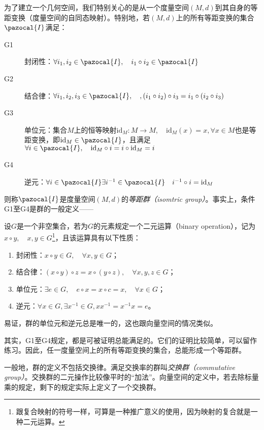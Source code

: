 \documentclass[../main.tex]{subfiles}
\begin{document}
为了建立一个几何空间，我们特别关心的是从一个度量空间$\left(M,d\right)$到其自身的等距变换（度量空间的自同态映射）。特别地，若$\left(M,d\right)$上的所有等距变换的集合$\pazocal{I}$满足：
\begin{description}
    \item[G1] 封闭性：$\forall i_1,i_2\in\pazocal{I},\quad i_1\circ i_2\in\pazocal{I}$
    \item[G2] 结合律：$\forall i_1,i_2,i_3\in\pazocal{I},\quad,\left(i_1\circ i_2\right)\circ i_3=i_1\circ\left(i_2\circ i_3\right)$
    \item[G3] 单位元：集合$M$上的恒等映射$\mathrm{id}_M:M\rightarrow M,\quad\mathrm{id}_M\left(x\right)=x,\forall x\in M$也是等距变换，即$\mathrm{id}_M\in\pazocal{I}$，且满足$\forall i\in\pazocal{I},\quad\mathrm{id}_M\circ i=i\circ\mathrm{id}_M=i$
    \item[G4] 逆元：$\forall i\in\pazocal{I}\exists i^{-1}\in\pazocal{I}\quad i^{-1}\circ i=\mathrm{id}_M$
\end{description}
则称$\pazocal{I}$是度量空间$\left(M,d\right)$的\emph{等距群（isomtric group）}。事实上，条件G1至G4是群的一般定义——

\begin{definition}[群]\label{def:II.3.3}
    设$G$是一个非空集合，若为$G$的元素规定一个二元运算（binary operation），记为$x\circ y,\quad x,y\in G$\footnote{跟复合映射的符号一样，可算是一种推广意义的使用，因为映射的复合就是一种二元运算。}，且该运算具有以下性质：
    \begin{enumerate}
        \item 封闭性：$x\circ y\in G,\quad\forall x,y\in G$；
        \item 结合律：$\left(x\circ y\right)\circ z=x\circ\left(y\circ z\right),\quad\forall x,y,z\in G$；
        \item 单位元：$\exists e\in G,\quad e\circ x=x\circ c=x,\quad\forall x\in G$；
        \item 逆元：$\forall x\in G,\exists x^{-1}\in G,xx^{-1}=x^{-1}x=e$。
    \end{enumerate}
\end{definition}

易证，群的单位元和逆元总是唯一的，这也跟向量空间的情况类似。

其实，G1至G4规定，都是可被证明总能满足的。它们的证明比较简单，可以留作练习。因此，任一度量空间上的所有等距变换的集合，总能形成一个等距群。

一般地，群的定义不包括交换律。满足交换率的群叫\emph{交换群（commutative group）}。交换群的二元操作比较像平时的“加法”。向量空间的定义中，若去除标量乘的规定，剩下的规定实际上定义了一个交换群。
\end{document}

